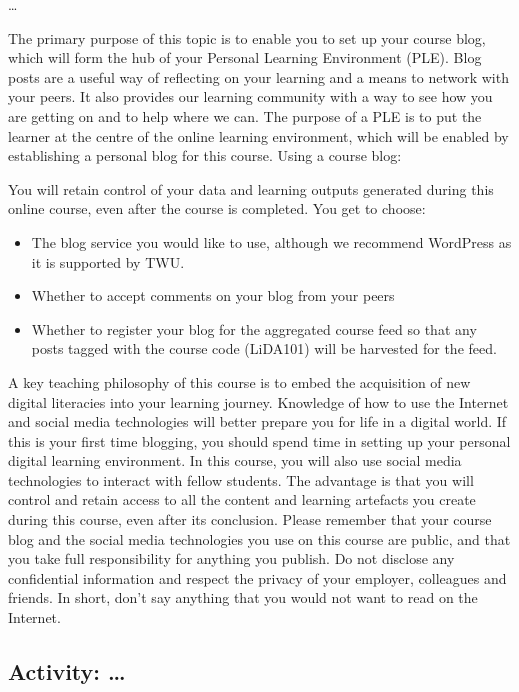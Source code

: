 \documentclass[
]{book}
\providecommand{\tightlist}{%
  \setlength{\itemsep}{0pt}\setlength{\parskip}{0pt}}
\theoremstyle{definition}
\theoremstyle{definition}
\theoremstyle{definition}
\theoremstyle{definition}
\theoremstyle{remark}
\begin{document}
\ldots{}

The primary purpose of this topic is to enable you to set up your course blog, which will form the hub of your Personal Learning Environment (PLE). Blog posts are a useful way of reflecting on your learning and a means to network with your peers. It also provides our learning community with a way to see how you are getting on and to help where we can. The purpose of a PLE is to put the learner at the centre of the online learning environment, which will be enabled by establishing a personal blog for this course. Using a course blog:

You will retain control of your data and learning outputs generated during this online course, even after the course is completed.
You get to choose:

\begin{itemize}
\tightlist
\item
  The blog service you would like to use, although we recommend WordPress as it is supported by TWU.
\item
  Whether to accept comments on your blog from your peers
\item
  Whether to register your blog for the aggregated course feed so that any posts tagged with the course code (LiDA101) will be harvested for the feed.
\end{itemize}

A key teaching philosophy of this course is to embed the acquisition of new digital literacies into your learning journey. Knowledge of how to use the Internet and social media technologies will better prepare you for life in a digital world. If this is your first time blogging, you should spend time in setting up your personal digital learning environment. In this course, you will also use social media technologies to interact with fellow students. The advantage is that you will control and retain access to all the content and learning artefacts you create during this course, even after its conclusion. Please remember that your course blog and the social media technologies you use on this course are public, and that you take full responsibility for anything you publish. Do not disclose any confidential information and respect the privacy of your employer, colleagues and friends. In short, don't say anything that you would not want to read on the Internet.

\hypertarget{activity-1}{%
\subsection*{Activity: \ldots{}}\label{activity-1}}
\end{document}
